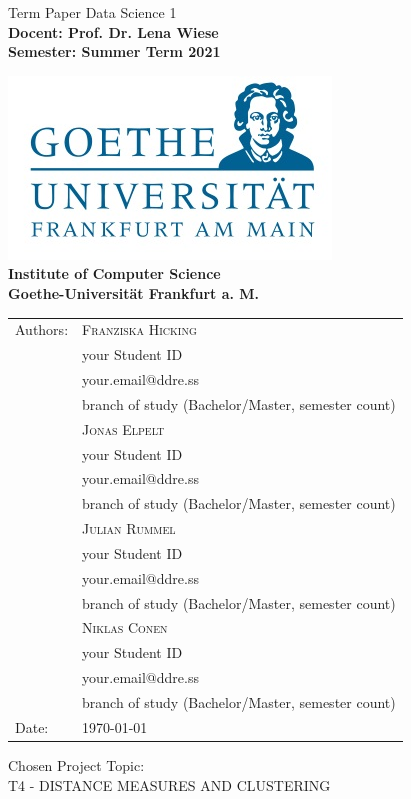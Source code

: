 \documentclass[12pt]%
{article}
\begin{document}
\begin{titlepage}

\begin{center}

{\Huge {
Term Paper Data Science 1}
}
\\[2ex]

\textbf{
\Large 
Docent: Prof. Dr. Lena Wiese \\ 
Semester: Summer Term 2021\\  
}



\includegraphics[scale=0.4]{logo.jpg} \\ 
\large{\textbf{Institute of Computer Science \\ Goethe-Universit\"at Frankfurt a. M.}}



\begin{tabular}{ll}
Authors: & \textsc{Franziska Hicking} \\
& {\small your Student ID} \\
& {\small your.email@ddre.ss} \\
& {\small branch of study (Bachelor/Master, semester count)} \\
& \textsc{Jonas Elpelt} \\
& {\small your Student ID}\\
&{\small  your.email@ddre.ss}\\
& {\small branch of study (Bachelor/Master, semester count)} \\
& \textsc{Julian Rummel} \\
&{\small  your Student ID}\\
& {\small your.email@ddre.ss }\\
&{\small  branch of study (Bachelor/Master, semester count)} \\
& \textsc{Niklas Conen}\\
& {\small your Student ID}\\
& {\small your.email@ddre.ss}\\
& {\small branch of study (Bachelor/Master, semester count)}\\
Date: & \today \\		
\end{tabular}

\end{center}

\vspace*{\fill}

\large
\noindent{}Chosen Project Topic: \\
T4 - DISTANCE MEASURES AND CLUSTERING


\end{titlepage}
\end{document}
